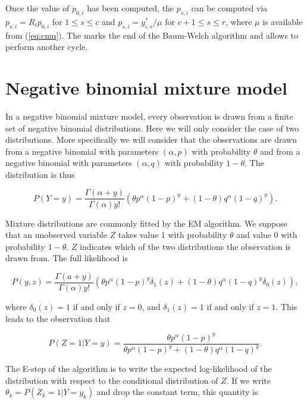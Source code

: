\documentclass[12pt]{article}
\begin{document}
\begin{appendices}
    Once the value of $p_{0,i}$ has been computed, the
    $p_{s,i}$ can be computed via $p_{s,i} = R_i p_{0,i}$ for
    $1 \leq s \leq c$ and $p_{s,i} = y_{i,s}^* / \mu$ for
    $c+1 \leq s \leq r$,
    where $\mu$ is available from (\ref{eq:cmu}). The marks
    the end of the Baum-Welch algorithm and allows to perform
    another cycle.


  \section{Negative binomial mixture model}
\label{mixture}

    In a negative binomial mixture model, every observation is drawn
    from a finite set of negative binomial distributions. Here we
    will only consider the case of two distributions. More specifically
    we will consider that the observations are drawn from a negative
    binomial with parameters $(\alpha, p)$ with probability $\theta$
    and from a negative binomial with parameters $(\alpha, q)$
    with probability $1-\theta$. The distribution is thus

    \begin{equation}
    P(Y = y) = \frac{\Gamma(\alpha+y)}{\Gamma(\alpha)y!}
    \left(\theta p^{\alpha}(1-p)^y + (1-\theta)q^{\alpha}(1-q)^y\right).
    \end{equation}

    Mixture distributions are commonly fitted by the EM algorithm.
    We suppose that an unobserved variable $Z$ takes value 1 with
    probability $\theta$ and value 0 with probability $1-\theta$.
    $Z$ indicates which of the two distributions the
    observation is drawn from. The full likelihood is

    \begin{equation*}
    P(y, z) = \frac{\Gamma(a+y)}{\Gamma(\alpha)y!}
    \left(\theta p^{\alpha}(1-p)^y \delta_1(z) + (1-\theta)
    q^{\alpha}(1-q)^y \delta_0(z)\right),
    \end{equation*}

    \noindent
    where $\delta_0(z) = 1$ if and only if $z = 0$, and
    $\delta_1(z) = 1$ if and only if $z = 1$. This leads to the
    observation that

    \begin{equation}
    P(Z=1 | Y=y) = \frac{\theta p^{\alpha}(1-p)^y}
      {\theta p^{\alpha}(1-p)^y + (1-\theta) q^{\alpha}(1-q)^y}.
    \end{equation}

    The E-step of the algorithm is to write the expected log-likelihood
    of the distribution with respect to the conditional distribution
    of $Z$. If we write $\theta_k = P(Z_k=1 | Y=y_k)$ and drop the
    constant term, this quantity is


\end{appendices}
\end{document}
